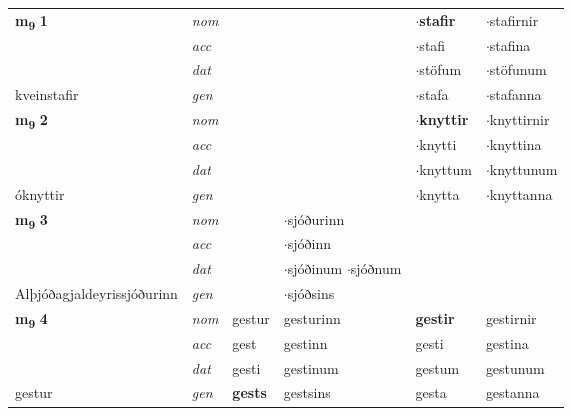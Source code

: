 \begin{longtable}[l]{llllll}
\multirow{3}{*}{{{\textbf{m{\textsubscript{9}}} \Large{\textbf{1}}}}}  & {\footnotesize{{\textit{nom}}}} &  &     & \textbf{$\cdot$stafir} & $\cdot$stafirnir  \\*
 &  {\footnotesize{{\textit{acc}}}} &   &    & $\cdot$stafi  & $\cdot$stafina \\*
 &  {\footnotesize{{\textit{dat}}}} &  &    & $\cdot$stöfum & $\cdot$stöfunum \\*
 {\footnotesize{kveinstafir}} &   {\footnotesize{{\textit{gen}}}} & \textbf{}  &   & $\cdot$stafa & $\cdot$stafanna \\
\cmidrule{1-6}


\multirow{3}{*}{{{\textbf{m{\textsubscript{9}}} \Large{\textbf{2}}}}}  & {\footnotesize{{\textit{nom}}}} &  &     & \textbf{$\cdot$knyttir} & $\cdot$knyttirnir  \\*
 &  {\footnotesize{{\textit{acc}}}} &   &    & $\cdot$knytti  & $\cdot$knyttina \\*
 &  {\footnotesize{{\textit{dat}}}} &  &    & $\cdot$knyttum & $\cdot$knyttunum \\*
 {\footnotesize{óknyttir}} &   {\footnotesize{{\textit{gen}}}} & \textbf{}  &   & $\cdot$knytta & $\cdot$knyttanna \\
\cmidrule{1-6}


\multirow{3}{*}{{{\textbf{m{\textsubscript{9}}} \Large{\textbf{3}}}}}  & {\footnotesize{{\textit{nom}}}} &  & $\cdot$sjóðurinn    & \textbf{} &   \\*
 &  {\footnotesize{{\textit{acc}}}} &   & $\cdot$sjóðinn   &   &  \\*
 &  {\footnotesize{{\textit{dat}}}} &  & \specialcell{$\cdot$sjóðinum\\  $\cdot$sjóðnum}   &  &  \\*
 {\footnotesize{Alþjóðagjaldeyrissjóðurinn}} &   {\footnotesize{{\textit{gen}}}} & \textbf{}  & $\cdot$sjóðsins  &  &  \\
\cmidrule{1-6}


\multirow{3}{*}{{{\textbf{m{\textsubscript{9}}} \Large{\textbf{4}}}}}  & {\footnotesize{{\textit{nom}}}} & gestur & gesturinn    & \textbf{gestir} & gestirnir  \\*
 &  {\footnotesize{{\textit{acc}}}} & gest  & gestinn   & gesti  & gestina \\*
 &  {\footnotesize{{\textit{dat}}}} & gesti & gestinum   & gestum & gestunum \\*
 {\footnotesize{gestur}} &   {\footnotesize{{\textit{gen}}}} & \textbf{gests}  & gestsins  & gesta & gestanna \\
\cmidrule{1-6}



\end{longtable}
